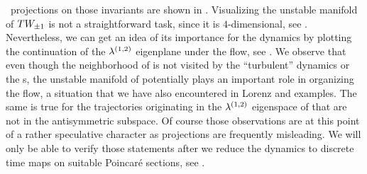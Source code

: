 \Statesp\ projections on those invariants are shown in
.
Visualizing the unstable manifold of $TW_{\pm1}$ is not a
straightforward task, since it is $4$-dimensional, see .
Nevertheless, we can get an idea of its importance for the dynamics
by plotting the continuation of the $\eigExp[1,2]$ eigenplane under the flow,
see .
We observe that even though the neighborhood of  is not visited
by the ``turbulent'' dynamics or the \rpo s, the unstable manifold
of  potentially plays an important role in organizing the flow, a situation
that we have also encountered in Lorenz and \CLe examples.
The same is true for the trajectories originating in the $\eigExp[1,2]$ eigenspace of 
that are not in the antisymmetric subspace. Of course those observations
are at this point of a rather speculative character as projections are frequently
misleading. We will only be able to verify those statements after we reduce
the dynamics to discrete time maps on suitable Poincar\'e sections,
see .



